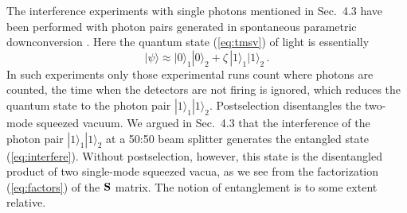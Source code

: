 \documentclass[12pt,amsmath,amssymb]{article}
\def\underline#1{{\bf #1}}
\numberwithin{equation}{section}
\begin{document}
The interference experiments with single photons
mentioned in Sec.\ 4.3 have been performed with photon pairs
generated in spontaneous parametric downconversion
\cite{MandelWolf}.
Here the quantum state (\ref{eq:tmsv}) of light is essentially
\begin{equation}
|\psi\rangle \approx
|0\rangle_1 |0\rangle_2
+\zeta\,|1\rangle_1 |1\rangle_2 \,.
\end{equation}
In such experiments only those experimental runs count where
photons are counted, the time when the detectors are not firing
is ignored, which reduces the quantum state to the photon pair
$|1\rangle_1 |1\rangle_2$. Postselection disentangles the
two-mode squeezed vacuum. We argued in Sec.\ 4.3
that the interference of the photon pair
$|1\rangle_1 |1\rangle_2$ at a 50:50 beam splitter
generates the entangled state (\ref{eq:interfere}).
Without postselection, however, this state is the disentangled
product of two single-mode squeezed vacua, as we see from
the factorization (\ref{eq:factors}) of the $\underline{S}$ matrix.
The notion of entanglement is to some extent relative.
\end{document}
